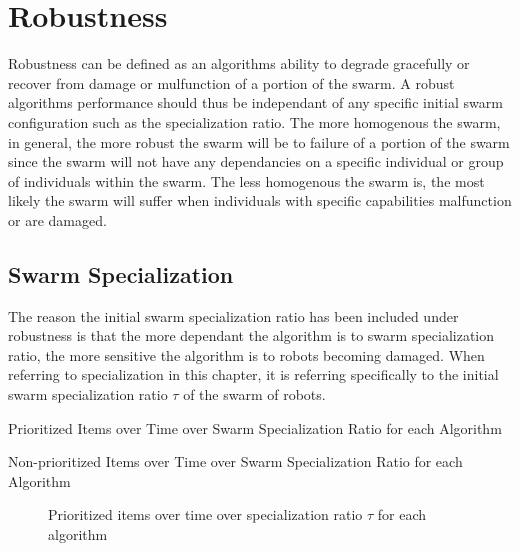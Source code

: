 \section{Robustness}
\label{results:robustness}

Robustness can be defined as an algorithms ability to degrade gracefully or recover from damage or mulfunction of a portion of the swarm. A robust algorithms performance should thus be independant of any specific initial swarm configuration such as the specialization ratio. The more homogenous the swarm, in general, the more robust the swarm will be to failure of a portion of the swarm since the swarm will not have any dependancies on a specific individual or group of individuals within the swarm. The less homogenous the swarm is, the most likely the swarm will suffer when individuals with specific capabilities malfunction or are damaged.

\subsection{Swarm Specialization}
\label{results:specialization}

The reason the initial swarm specialization ratio has been included under robustness is that the more dependant the algorithm is to swarm specialization ratio, the more sensitive  the algorithm is to robots becoming damaged. When referring to specialization in this chapter, it is referring specifically to the initial swarm specialization ratio $\tau$ of the swarm of robots. 

\begin{table} [h]
     \caption{Prioritized Items over Time over Swarm Specialization Ratio for each Algorithm}
     \label{specializationprioritized}
	\centering
	\footnotesize
	
\end{table}

\begin{table} [h]
     \caption{Non-prioritized Items over Time over Swarm Specialization Ratio for each Algorithm}
     \label{specializationnonprioritized}
	\centering
	\footnotesize
	
\end{table}

\begin{figure}[!htb]
\centering
\resizebox{\textwidth}{!}{}
\caption{Prioritized items over time over specialization ratio $\tau$ for each algorithm }
\label{divisiongoldplot}
\end{figure}

